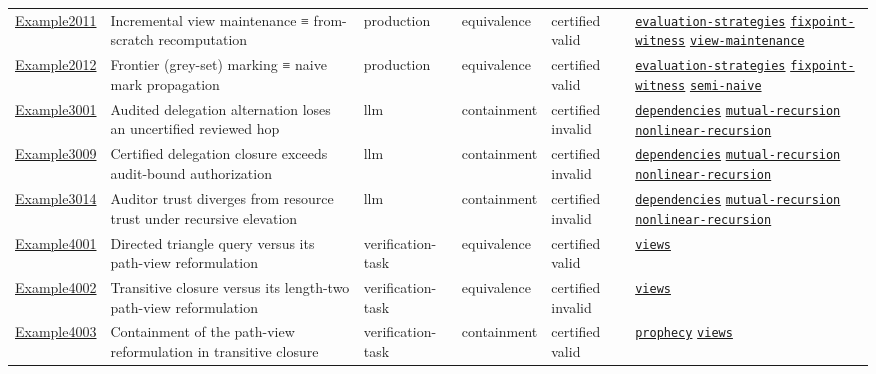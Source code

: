 \documentclass[10pt]{article}
\begin{document}
\begin{longtable}{@{}lp{}p{}p{}p{}p{}@{}}
\hyperref[case:Example2011]{Example2011} & Incremental view maintenance ≡ from-scratch recomputation & production & equivalence & certified valid & {\scriptsize \hyperref[tag:evaluation-strategies]{\texttt{evaluation-strategies}} \hyperref[tag:fixpoint-witness]{\texttt{fixpoint-witness}} \hyperref[tag:view-maintenance]{\texttt{view-maintenance}}} \\
\hyperref[case:Example2012]{Example2012} & Frontier (grey-set) marking ≡ naive mark propagation & production & equivalence & certified valid & {\scriptsize \hyperref[tag:evaluation-strategies]{\texttt{evaluation-strategies}} \hyperref[tag:fixpoint-witness]{\texttt{fixpoint-witness}} \hyperref[tag:semi-naive]{\texttt{semi-naive}}} \\
\hyperref[case:Example3001]{Example3001} & Audited delegation alternation loses an uncertified reviewed hop & llm & containment & certified invalid & {\scriptsize \hyperref[tag:dependencies]{\texttt{dependencies}} \hyperref[tag:mutual-recursion]{\texttt{mutual-recursion}} \hyperref[tag:nonlinear-recursion]{\texttt{nonlinear-recursion}}} \\
\hyperref[case:Example3009]{Example3009} & Certified delegation closure exceeds audit-bound authorization & llm & containment & certified invalid & {\scriptsize \hyperref[tag:dependencies]{\texttt{dependencies}} \hyperref[tag:mutual-recursion]{\texttt{mutual-recursion}} \hyperref[tag:nonlinear-recursion]{\texttt{nonlinear-recursion}}} \\
\hyperref[case:Example3014]{Example3014} & Auditor trust diverges from resource trust under recursive elevation & llm & containment & certified invalid & {\scriptsize \hyperref[tag:dependencies]{\texttt{dependencies}} \hyperref[tag:mutual-recursion]{\texttt{mutual-recursion}} \hyperref[tag:nonlinear-recursion]{\texttt{nonlinear-recursion}}} \\
\hyperref[case:Example4001]{Example4001} & Directed triangle query versus its path-view reformulation & verification-task & equivalence & certified valid & {\scriptsize \hyperref[tag:views]{\texttt{views}}} \\
\hyperref[case:Example4002]{Example4002} & Transitive closure versus its length-two path-view reformulation & verification-task & equivalence & certified invalid & {\scriptsize \hyperref[tag:views]{\texttt{views}}} \\
\hyperref[case:Example4003]{Example4003} & Containment of the path-view reformulation in transitive closure & verification-task & containment & certified valid & {\scriptsize \hyperref[tag:prophecy]{\texttt{prophecy}} \hyperref[tag:views]{\texttt{views}}} \\

\end{longtable}
\end{document}
